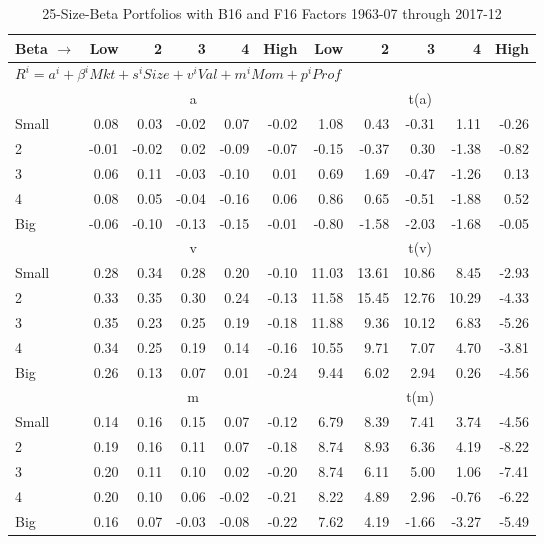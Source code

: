 
\begin{table}[!ht]
\footnotesize
\centering
\caption{25-Size-Beta Portfolios with B16 and F16 Factors
1963-07 through 2017-12}
\begin{tabular}{lrrrrrrrrrr}
  \toprule
    
    Beta $\rightarrow$ & Low & 2 & 3 & 4 & High & Low & 2 & 3 & 4 & High  \\ 
  \midrule
  \multicolumn{11}{l}{$R^i=a^i+\beta^iMkt+s^iSize+v^iVal+m^iMom+p^iProf$}  \\
  
     & \multicolumn{5}{c}{a} & \multicolumn{5}{c}{t(a)}   \\
     \cmidrule(r){2-6} \cmidrule(r){7-11} 
    Small  & 0.08  & 0.03  & -0.02  & 0.07  & -0.02  & 1.08  & 0.43  & -0.31  & 1.11  & -0.26   \\
    2  & -0.01  & -0.02  & 0.02  & -0.09  & -0.07  & -0.15  & -0.37  & 0.30  & -1.38  & -0.82   \\
    3  & 0.06  & 0.11  & -0.03  & -0.10  & 0.01  & 0.69  & 1.69  & -0.47  & -1.26  & 0.13   \\
    4  & 0.08  & 0.05  & -0.04  & -0.16  & 0.06  & 0.86  & 0.65  & -0.51  & -1.88  & 0.52   \\
    Big  & -0.06  & -0.10  & -0.13  & -0.15  & -0.01  & -0.80  & -1.58  & -2.03  & -1.68  & -0.05   \\

     & \multicolumn{5}{c}{v} & \multicolumn{5}{c}{t(v)}   \\
     \cmidrule(r){2-6} \cmidrule(r){7-11} 
    Small  & 0.28  & 0.34  & 0.28  & 0.20  & -0.10  & 11.03  & 13.61  & 10.86  & 8.45  & -2.93   \\
    2  & 0.33  & 0.35  & 0.30  & 0.24  & -0.13  & 11.58  & 15.45  & 12.76  & 10.29  & -4.33   \\
    3  & 0.35  & 0.23  & 0.25  & 0.19  & -0.18  & 11.88  & 9.36  & 10.12  & 6.83  & -5.26   \\
    4  & 0.34  & 0.25  & 0.19  & 0.14  & -0.16  & 10.55  & 9.71  & 7.07  & 4.70  & -3.81   \\
    Big  & 0.26  & 0.13  & 0.07  & 0.01  & -0.24  & 9.44  & 6.02  & 2.94  & 0.26  & -4.56   \\
    
  
     & \multicolumn{5}{c}{m} & \multicolumn{5}{c}{t(m)}   \\
     \cmidrule(r){2-6} \cmidrule(r){7-11} 
    Small  & 0.14  & 0.16  & 0.15  & 0.07  & -0.12  & 6.79  & 8.39  & 7.41  & 3.74  & -4.56   \\
    2  & 0.19  & 0.16  & 0.11  & 0.07  & -0.18  & 8.74  & 8.93  & 6.36  & 4.19  & -8.22   \\
    3  & 0.20  & 0.11  & 0.10  & 0.02  & -0.20  & 8.74  & 6.11  & 5.00  & 1.06  & -7.41   \\
    4  & 0.20  & 0.10  & 0.06  & -0.02  & -0.21  & 8.22  & 4.89  & 2.96  & -0.76  & -6.22   \\
    Big  & 0.16  & 0.07  & -0.03  & -0.08  & -0.22  & 7.62  & 4.19  & -1.66  & -3.27  & -5.49   \\
    

\end{tabular}
\end{table}
